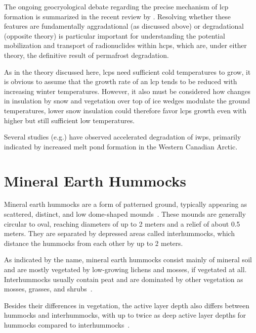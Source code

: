 The ongoing geocryological debate regarding the precise mechanism of \gls{lcp} formation is summarized in the recent review by \citet{shurFormationLowCenteredIceWedge2025}. 
Resolving whether these features are fundamentally aggradational (as discussed above) or degradational (opposite theory) is particular important for understanding the potential mobilization and transport of radionuclides within \glspl{hcp}, which are, under either theory, the definitive result of permafrost degradation.

As in the theory discussed here, \glspl{lcp} need sufficient cold temperatures to grow, it is obvious to assume that the growth rate of an \gls{lcp} tends to be reduced with increasing winter temperatures. 
However, it also must be considered how changes in insulation by snow and vegetation over top of ice wedges modulate the ground temperatures, lower snow insulation could therefore favor \glspl{lcp} growth even with higher but still sufficient low temperatures.

Several studies (e.g.\citep{fraserRecentPondingUpland2023,steedmanSpatioTemporalVariationHighCentre2017}) have observed accelerated degradation of \glspl{iwp}, primarily indicated by increased melt pond formation in the Western Canadian Arctic.

\section{Mineral Earth Hummocks}
Mineral earth hummocks are a form of patterned ground, typically appearing as scattered, distinct, and low dome-shaped mounds~\citep{kokeljStructureDynamicsEarth2007}. 
These mounds are generally circular to oval, reaching diameters of up to 2 meters and a relief of about 0.5 meters. 
They are separated by depressed areas called interhummocks, which distance the hummocks from each other by up to 2 meters.

As indicated by the name, mineral earth hummocks consist mainly of mineral soil and are mostly vegetated by low-growing lichens and mosses, if vegetated at all. 
Interhummocks usually contain peat and are dominated by other vegetation as mosses, grasses, and shrubs~\citep{dakinHowDryYear2023,kokeljStructureDynamicsEarth2007,quintonSubsurfaceDrainageHummockcovered2000}.

Besides their differences in vegetation, the active layer depth also differs between hummocks and interhummocks, with up to twice as deep active layer depths for hummocks compared to interhummocks~\citep{kokeljStructureDynamicsEarth2007}.

